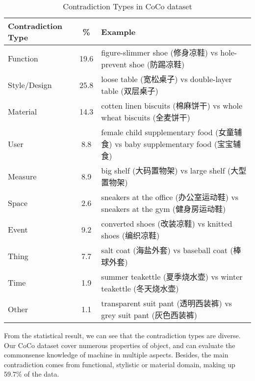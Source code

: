 \begin{table}[h!]
	\small
	\centering
	\begin{tabular}{m{1.7cm}|c|m{4.5cm}}
		Contradiction Type & \% & Example \\
		\hline
		Function & 19.6 & figure-slimmer shoe (修身凉鞋) vs hole-prevent shoe (防踢凉鞋) \\
		Style/Design & 25.8 & loose table (宽松桌子) vs double-layer table (双层桌子) \\
		Material & 14.3 & cotten linen biscuits (棉麻饼干) vs whole wheat biscuits (全麦饼干) \\
		User & 8.8 & female child supplementary food (女童辅食) vs baby supplementary food (宝宝辅食)  \\
		Measure & 8.9 & big shelf (大码置物架) vs large shelf (大型置物架) \\
		Space & 2.6 & sneakers at the office (办公室运动鞋) vs sneakers at the gym (健身房运动鞋) \\
		Event & 9.2 & converted shoes (改装凉鞋) vs knitted shoes (编织凉鞋) \\
		Thing & 7.7 & salt coat (海盐外套) vs baseball coat (棒球外套) \\
		Time & 1.9 & summer teakettle (夏季烧水壶) vs winter teakettle (冬天烧水壶) \\
		Other & 1.1 & transparent suit pant (透明西装裤) vs grey suit pant (灰色西装裤) 
	\end{tabular}
	\caption{Contradiction Types in CoCo dataset}
	\label{tab:contradictionType}	
\end{table}

From the statistical result, we can see that the contradiction types are diverse. Our CoCo dataset cover numerous properties of object, and can evaluate the commonsense knowledge of machine in multiple aspects. Besides, the main contradiction comes from functional, stylistic or material domain, making up 59.7\% of the data.

